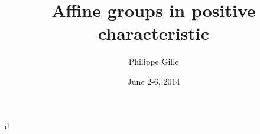 \documentclass{article}
\title{Affine groups in positive characteristic}
\author{Philippe Gille}
\date{June 2-6, 2014}
\begin{document}
\maketitle





d
\end{document}

